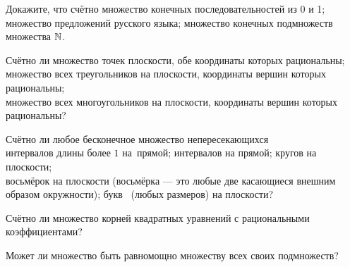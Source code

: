 \documentclass[a4paper,12pt]{article}
\begin{document}
 Докажите, что счётно \quad
 множество конечных последовательностей из 0 и 1;\\
 множество предложений русского языка;
 множество конечных подмножеств множества $\mathbb{N}$.

 Счётно ли \quad
 множество точек плоскости, обе координаты которых рациональны;\\
 множество всех треугольников на плоскости, координаты
вершин которых рациональны;\\
 множество всех многоугольников на плоскости, координаты
вершин которых рациональны?

Счётно ли %
любое бесконечное множество непересекающихся\\
интервалов длины более $1$ на~прямой;
интервалов на прямой;
кругов на плоскости;\\
восьмёрок на плоскости
(восьмёрка --- это любые две касающиеся внешним образом
окружности);
букв \
(любых размеров) на плоскости?

Счётно ли множество корней квадратных уравнений с рациональными
коэффициентами?


Может ли множество быть равномощно множеству всех своих подмножеств?
\кзадача






\end{document}
